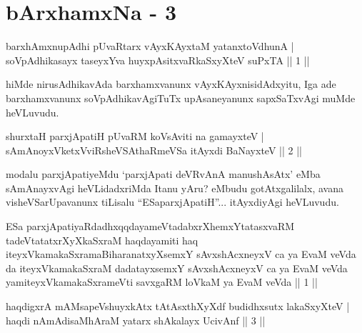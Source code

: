 
\chapter{bArxhamxNa - 3}
 \begin{shl}
barxhAmxnupAdhi pUvaRtarx vAyxKAyxtaM yatanxtoV\s dhunA | \\
soVpAdhikasayx taseyxYva huyxpAsitxvaRkaSxyXteV suPxTA \hfill ||  1 || 
\end{shl}

\begin{artha}
hiMde nirusAdhikavAda barxhamxvanunx vAyxKAyxnisidAdxyitu, Iga ade barxhamxvanunx soVpAdhikavAgiTuTx upAsaneyanunx sapxSaTxvAgi muMde heVLuvudu.
\end{artha}

\begin{shl}
shurxtaH parxjApatiH pUvaRM koV\s sAviti na gamayxteV | \\
sAmAnoyxVketxVviRsheVSAthaRmeVSa itAyxdi BaNayxteV \hfill ||  2 || 
\end{shl}	

\begin{artha}
modalu parxjApatiyeMdu `parxjApati deVRvAnA manushAsAtx' eMba sAmAnayxvAgi heVLidadxriMda Itanu yAru? eMbudu gotAtxgalilalx, avana visheVSarUpavanunx tiLisalu ``ESaparxjApatiH''... itAyxdiyAgi heVLuvudu.
\end{artha}

\begin{kandikeshl}
ESa parxjApatiyaRdadhxqqdayameVtadabxrXhemxYtatasxvaRM tadeVtatatxrXyXkaSxraM haqdayamiti haq iteyxVkamakaSxramaBiharanatxyXsemxY sAvxshAcxneyxV ca ya EvaM veVda da iteyxVkamakaSxraM dadatayxsemxY sAvxshAcxneyxV ca ya EvaM veVda yamiteyxVkamakaSxrameVti savxgaRM loVkaM ya EvaM veVda || 1 ||
\end{kandikeshl}


\begin{shl}
haqdigxrA mAMsapeVshuyxkAtx tAtAsxthXyXdf budidhxsutx lakaSxyXteV | \\
haqdi nAmAdisaMhAraM yatarx shAkalayx UcivAnf \hfill ||  3 || 
\end{shl}

